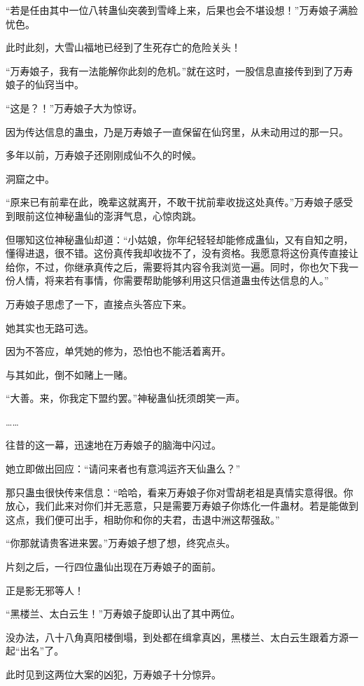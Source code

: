 \begin{this_body}
“若是任由其中一位八转蛊仙突袭到雪峰上来，后果也会不堪设想！”万寿娘子满脸忧色。

此时此刻，大雪山福地已经到了生死存亡的危险关头！

“万寿娘子，我有一法能解你此刻的危机。”就在这时，一股信息直接传到到了万寿娘子的仙窍当中。

“这是？！”万寿娘子大为惊讶。

因为传达信息的蛊虫，乃是万寿娘子一直保留在仙窍里，从未动用过的那一只。

多年以前，万寿娘子还刚刚成仙不久的时候。

洞窟之中。

“原来已有前辈在此，晚辈这就离开，不敢干扰前辈收拢这处真传。”万寿娘子感受到眼前这位神秘蛊仙的澎湃气息，心惊肉跳。

但哪知这位神秘蛊仙却道：“小姑娘，你年纪轻轻却能修成蛊仙，又有自知之明，懂得进退，很不错。这份真传我却收拢不了，没有资格。我愿意将这份真传直接让给你，不过，你继承真传之后，需要将其内容令我浏览一遍。同时，你也欠下我一份人情，将来若有事情，你需要帮助能够利用这只信道蛊虫传达信息的人。”

万寿娘子思虑了一下，直接点头答应下来。

她其实也无路可选。

因为不答应，单凭她的修为，恐怕也不能活着离开。

与其如此，倒不如赌上一赌。

“大善。来，你我定下盟约罢。”神秘蛊仙抚须朗笑一声。

……

往昔的这一幕，迅速地在万寿娘子的脑海中闪过。

她立即做出回应：“请问来者也有意鸿运齐天仙蛊么？”

那只蛊虫很快传来信息：“哈哈，看来万寿娘子你对雪胡老祖是真情实意得很。你放心，我们此来对你们并无恶意，只是需要万寿娘子你炼化一件蛊材。若是能做到这点，我们便可出手，相助你和你的夫君，击退中洲这帮强敌。”

“你那就请贵客进来罢。”万寿娘子想了想，终究点头。

片刻之后，一行四位蛊仙出现在万寿娘子的面前。

正是影无邪等人！

“黑楼兰、太白云生！”万寿娘子旋即认出了其中两位。

没办法，八十八角真阳楼倒塌，到处都在缉拿真凶，黑楼兰、太白云生跟着方源一起“出名”了。

此时见到这两位大案的凶犯，万寿娘子十分惊异。


\end{this_body}
